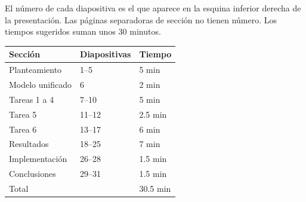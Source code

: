\documentclass[11pt,a4paper,oneside]{article}
\begin{document}
El número de cada diapositiva es el que aparece en la esquina inferior derecha de la
presentación. Las páginas separadoras de sección no tienen número. Los tiempos
sugeridos suman unos 30 minutos.

\begin{center}
\small
\begin{tabular}{lll}
\toprule
Sección & Diapositivas & Tiempo \\
\midrule
Planteamiento & 1–5 & 5 min \\
Modelo unificado & 6 & 2 min \\
Tareas 1 a 4 & 7–10 & 5 min \\
Tarea 5 & 11–12 & 2.5 min \\
Tarea 6 & 13–17 & 6 min \\
Resultados & 18–25 & 7 min \\
Implementación & 26–28 & 1.5 min \\
Conclusiones & 29–31 & 1.5 min \\
\midrule
Total & & 30.5 min \\
\bottomrule
\end{tabular}
\end{center}

\clearpage






\end{document}

